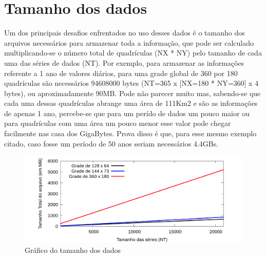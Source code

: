 \section{Tamanho dos dados}

Um dos principais desafios enfrentados no uso desses dados é o tamanho dos arquivos necessários para armazenar toda a informação, que pode ser calculado multiplicando-se o número total de quadrículas (NX * NY) pelo tamanho de cada uma das séries de dados (NT). Por exemplo, para armazenar as informações referente a 1 ano de valores diários, para uma grade global de 360 por 180 quadrículas são necessários 94608000 bytes (NT=365 x [NX=180 * NY=360] x 4 bytes), ou aproximadamente 90MB. Pode não parecer muito mas, sabendo-se que cada uma dessas quadrículas abrange uma área de 111Km2 e são as informações de apenas 1 ano, percebe-se que para um perído de dados um pouco maior ou para quadrículas com uma área um pouco menor esse valor pode chegar facilmente nas casa dos GigaBytes. Prova disso é que, para esse mesmo exemplo citado, caso fosse um período de 50 anos seriam necessários 4.4GBs.

\begin{figure}[H]
\centering
\includegraphics[width=1.0\textwidth]{Imagens/tamanho_dados/serie_tam_dados.png}
\caption{Gráfico do tamanho dos dados}
\label{fig:grafico_tamanho_dados}
\end{figure}
